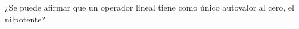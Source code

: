 \item ¿Se puede afirmar que un operador lineal tiene como único autovalor al cero, el nilpotente?
    \begin{mdframed}[style=s]
        
    \end{mdframed}